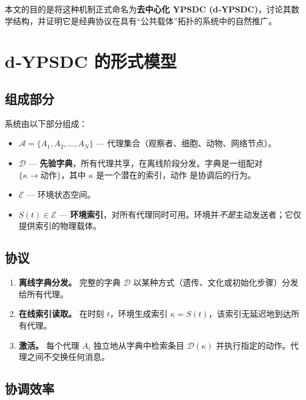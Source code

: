 \documentclass[11pt,a4paper]{article}
\begin{document}
	本文的目的是将这种机制正式命名为\textbf{去中心化 YPSDC (d‑YPSDC)}，讨论其数学结构，并证明它是经典协议在具有“公共载体”拓扑的系统中的自然推广。
	
	\section{d‑YPSDC 的形式模型}
	
	\subsection{组成部分}
	
	系统由以下部分组成：
	
	\begin{itemize}[leftmargin=*]
		\item \(\mathcal{A} = \{A_1, A_2, \dots, A_N\}\) — 代理集合（观察者、细胞、动物、网络节点）。
		\item \(\mathcal{D}\) — \textbf{先验字典}，所有代理共享，在离线阶段分发。字典是一组配对 \(\{ \kappa \to \text{动作} \}\)，其中 \(\kappa\) 是一个潜在的索引，\(\text{动作}\) 是协调后的行为。
		\item \(\mathcal{E}\) — 环境状态空间。
		\item \(S(t) \in \mathcal{E}\) — \textbf{环境索引}，对所有代理同时可用。环境并\emph{不是}主动发送者；它仅提供索引的物理载体。
	\end{itemize}
	
	\subsection{协议}
	
	\begin{enumerate}[leftmargin=*, label=\textbf{第 \arabic* 阶段：}]
		\item \textbf{离线字典分发。} 完整的字典 \(\mathcal{D}\) 以某种方式（遗传、文化或初始化步骤）分发给所有代理。
		\item \textbf{在线索引读取。} 在时刻 \(t\)，环境生成索引 \(\kappa = S(t)\)，该索引无延迟地到达所有代理。
		\item \textbf{激活。} 每个代理 \(A_i\) 独立地从字典中检索条目 \(\mathcal{D}(\kappa)\) 并执行指定的动作。代理之间不交换任何消息。
	\end{enumerate}
	
	\subsection{协调效率}
	
\end{document}
